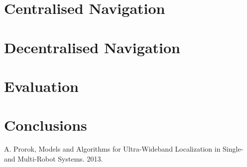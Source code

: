 \documentclass[10pt,a4paper]{article}
\begin{document}
\section{Centralised Navigation}
\section{Decentralised Navigation}
\section{Evaluation}
\section{Conclusions}
\begin{thebibliography}{9}
 A. Prorok, Models and Algorithms for Ultra-Wideband Localization in Single- and Multi-Robot Systems. 2013.
\end{thebibliography}
\end{document}
